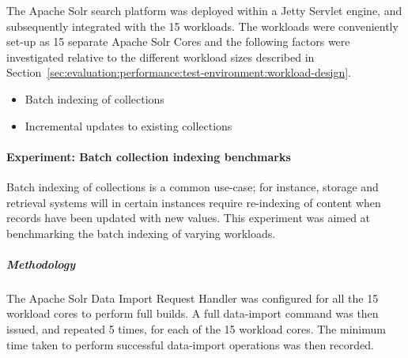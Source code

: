 The Apache Solr search platform was deployed within a Jetty Servlet engine, and
subsequently integrated with the 15 workloads. The workloads were conveniently
set-up as 15 separate Apache Solr Cores and the following factors were
investigated relative to the different workload sizes described in Section~\ref{sec:evaluation:performance:test-environment:workload-design}.

\begin{itemize}
 \item Batch indexing of collections
 \item Incremental updates to existing collections
\end{itemize}

% 
\begin{comment}
\begin{figure}
 \centering
 \framebox[\textwidth]{%

 }
 \caption[Apache Solr Core set-up]{Experiment set-up for Apache Solr Cores within Jetty Servlet engine}
 \label{fig:experimentation:performance:indexing:solr-core-set-up}
\end{figure}
\end{comment}

\paragraph{Experiment: Batch collection indexing benchmarks}
\label{sec:evaluation:performance:indexing:experiment1}

Batch indexing of collections is a common use-case; for instance, storage and
retrieval systems will in certain instances require re-indexing of content when
records have been updated with new values. This experiment was aimed at
benchmarking the batch indexing of varying workloads.

\subparagraph{Methodology}

The Apache Solr Data Import Request Handler \citep{SolrDIH2012} was
configured for all the 15 workload cores to perform full builds. A full
data-import command was then issued, and repeated 5 times, for each of the 15
workload cores. The minimum time taken to perform successful data-import
operations was then recorded.

